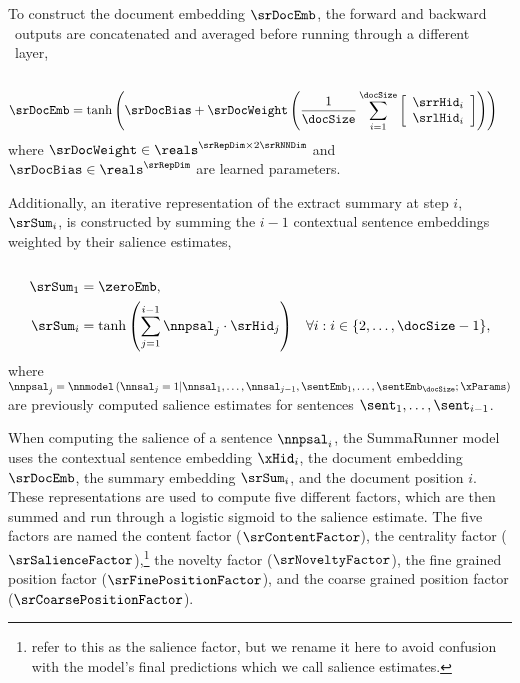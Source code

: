 To construct the document embedding $\srDocEmb$, the forward and backward
\gru~outputs are concatenated and averaged before running through a different
\feedforward~layer,\\

\noindent{}\\[-40pt]
\begin{align}
\srDocEmb  & = \tanh\left(\srDocBias + \srDocWeight \left(\frac{1}{\docSize}\sum_{i=1}^{\docSize} \left[ \begin{array}{c} \srrHid_i \\ \srlHid_i  \end{array} \right] \right) \right)
\end{align}
where $\srDocWeight \in \reals^{\srRepDim \times 2\srRNNDim}$ and $\srDocBias
\in \reals^{\srRepDim}$ are learned parameters.

Additionally, an iterative representation of the extract summary at step $i$,
$\srSum_i$, is constructed by summing the $i-1$ contextual sentence embeddings
weighted by their salience estimates,\\

\noindent{}\\[-40pt]
\begin{align}
\srSum_1 & = \zeroEmb, \\
\srSum_i & = \tanh\left(\sum_{j=1}^{i-1} \nnpsal_j \cdot \srHid_j\right)
& \forall i: i \in \{2,\ldots,\docSize-1 \},
\end{align}
where $\nnpsal_j=
\nnmodel\left(\nnsal_j=1|\nnsal_1,\ldots,\nnsal_{j-1},\sentEmb_1, \ldots,
\sentEmb_\docSize; \xParams\right)$ are previously computed salience estimates
for sentences $\sent_1,\ldots,\sent_{i-1}$.



When computing the salience of a sentence $\nnpsal_i$, the SummaRunner model
uses the contextual sentence embedding $\xHid_i$, the document embedding
$\srDocEmb$, the summary embedding $\srSum_i$, and the document position $i$.
These representations are used to compute five different factors, which are
then summed and run through a logistic sigmoid to the salience estimate.  The
five factors are named the content factor ($\srContentFactor$), the centrality
factor ($\srSalienceFactor$),\footnote{\citet{nallapati2017summarunner} refer
to this as the salience factor, but we rename it here to avoid confusion with
the model's final predictions which we call salience estimates.} the novelty
factor ($\srNoveltyFactor$), the fine grained position factor
($\srFinePositionFactor$), and the coarse grained position factor
($\srCoarsePositionFactor$).

